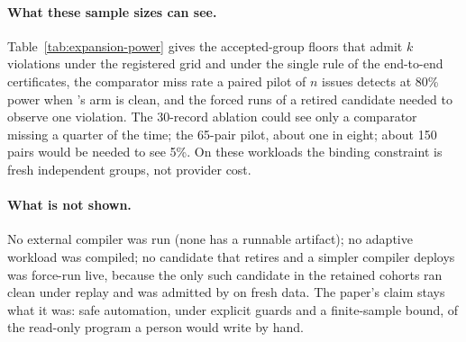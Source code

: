 \begin{table}[t]
  \centering\small
  \caption{Live pilot on 65 fresh issues, paired arms; per-issue means.}
  \label{tab:compiler-funnel-pilot}
  
\end{table}

\paragraph{What these sample sizes can see.}
Table~\ref{tab:expansion-power} gives the accepted-group floors that admit $k$ violations under
the registered grid and under the single rule of the end-to-end certificates, the comparator
miss rate a paired pilot of $n$ issues detects at 80\% power when \method{}'s arm is clean, and
the forced runs of a retired candidate needed to observe one violation. The 30-record ablation
could see only a comparator missing a quarter of the time; the 65-pair pilot, about one in eight;
about 150 pairs would be needed to see 5\%. On these workloads the binding constraint is fresh
independent groups, not provider cost.

\begin{table}[t]
  \centering\small
  \caption{Design arithmetic for admission and comparison at $\alpha = 0.05$.}
  \label{tab:expansion-power}
  
\end{table}

\paragraph{What is not shown.}
No external compiler was run (none has a runnable artifact); no adaptive workload was compiled;
no candidate that \method{} retires and a simpler compiler deploys was force-run live, because the
only such candidate in the retained cohorts ran clean under replay and was admitted by \method{}
on fresh data. The paper's claim stays what it was: safe automation, under explicit guards and a
finite-sample bound, of the read-only program a person would write by hand.
